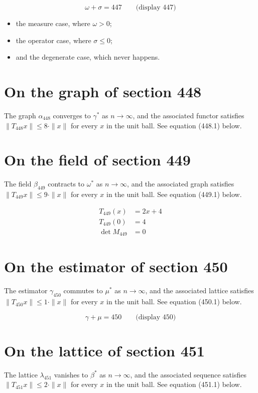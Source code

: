 \documentclass{article}
\begin{document}
$$
\omega + \sigma = 447 \qquad \text{(display 447)}
$$

\begin{itemize}
  \item the measure case, where $\omega > 0$;
  \item the operator case, where $\sigma \leq 0$;
  \item and the degenerate case, which never happens.
\end{itemize}

\section{On the graph of section 448}
The graph $\alpha_{448}$ converges to $\gamma^{*}$ as $n \to \infty$,
and the associated functor satisfies $\|T_{448} x\| \leq 8 \cdot \|x\|$
for every $x$ in the unit ball. See equation (448.1) below.

\section{On the field of section 449}
The field $\beta_{449}$ contracts to $\omega^{*}$ as $n \to \infty$,
and the associated graph satisfies $\|T_{449} x\| \leq 9 \cdot \|x\|$
for every $x$ in the unit ball. See equation (449.1) below.

\begin{align}
T_{449}(x) &= 2 x + 4 \\
T_{449}(0) &= 4 \\
\det M_{449} &= 0
\end{align}

\section{On the estimator of section 450}
The estimator $\gamma_{450}$ commutes to $\mu^{*}$ as $n \to \infty$,
and the associated lattice satisfies $\|T_{450} x\| \leq 1 \cdot \|x\|$
for every $x$ in the unit ball. See equation (450.1) below.

$$
\gamma + \mu = 450 \qquad \text{(display 450)}
$$

\section{On the lattice of section 451}
The lattice $\lambda_{451}$ vanishes to $\beta^{*}$ as $n \to \infty$,
and the associated sequence satisfies $\|T_{451} x\| \leq 2 \cdot \|x\|$
for every $x$ in the unit ball. See equation (451.1) below.
\end{document}
